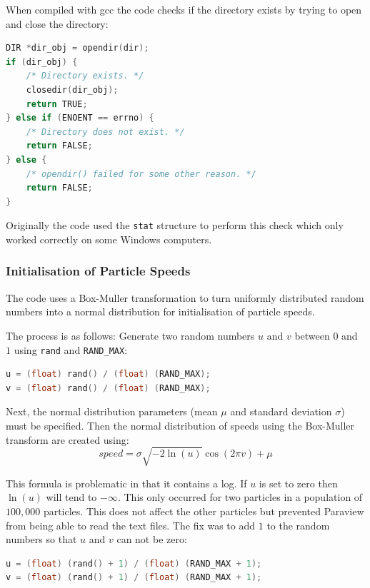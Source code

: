 \documentclass[../Interim_Report_Master]{subfiles}
\begin{document}
When compiled with gcc the code checks if the directory exists by trying to open and close the directory:
\begin{lstlisting}[frame=single, language=C]
DIR *dir_obj = opendir(dir);
if (dir_obj) {
	/* Directory exists. */
	closedir(dir_obj);
	return TRUE;
} else if (ENOENT == errno) {
	/* Directory does not exist. */
	return FALSE;
} else {
	/* opendir() failed for some other reason. */
	return FALSE;
}
\end{lstlisting}

Originally the code used the  \lstinline[language=c, columns=fixed]|stat| structure to perform this check which only worked correctly on some Windows computers.

\subsubsection{Initialisation of Particle Speeds}
The code uses a Box-Muller transformation to turn uniformly distributed random numbers into a normal distribution for initialisation of particle speeds. 

The process is as follows:
Generate two random numbers $u$ and $v$ between $0$ and $1$ using \lstinline[language=c, columns=fixed]|rand| and \lstinline[language=c, columns=fixed]|RAND_MAX|:
\begin{lstlisting}[frame=single, language=C]
u = (float) rand() / (float) (RAND_MAX);
v = (float) rand() / (float) (RAND_MAX);
\end{lstlisting}

Next, the normal distribution parameters (mean $\mu$ and standard deviation $\sigma$) must be specified. Then the normal distribution of speeds using the Box-Muller transform are created using:
\begin{equation}
speed = \sigma \sqrt{-2\ln(u)} \cos(2\pi v) + \mu
\end{equation}

This formula is problematic in that it contains a log. If $u$ is set to zero then $\ln(u)$ will tend to $-\infty$. This only occurred for two particles in a population of $100,000$ particles. This does not affect the other particles but prevented Paraview from being able to read the text files. The fix was to add $1$ to the random numbers so that $u$ and $v$ can not be zero:
\begin{lstlisting}[frame=single, language=C]
u = (float) (rand() + 1) / (float) (RAND_MAX + 1);
v = (float) (rand() + 1) / (float) (RAND_MAX + 1);
\end{lstlisting}
\end{document}
